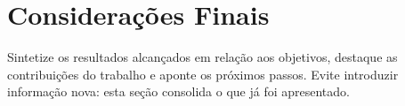 \section{Considerações Finais}

Sintetize os resultados alcançados em relação aos objetivos, destaque as
contribuições do trabalho e aponte os próximos passos. Evite introduzir
informação nova: esta seção consolida o que já foi apresentado.
